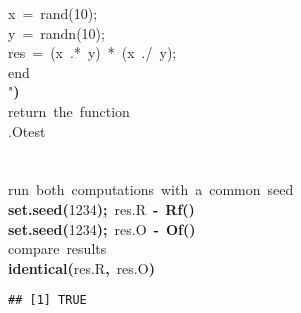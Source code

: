 \documentclass[english,10pt,a4paper]{article}\usepackage{graphicx, color}
\makeatletter
\newcommand{\hlnumber}[1]{\textcolor[rgb]{0,0,0}{#1}}%
\newcommand{\hlfunctioncall}[1]{\textcolor[rgb]{0.501960784313725,0,0.329411764705882}{\textbf{#1}}}%
\newcommand{\hlkeyword}[1]{\textcolor[rgb]{0,0,0}{\textbf{#1}}}%
\newcommand{\hlcomment}[1]{\textcolor[rgb]{0.180392156862745,0.6,0.341176470588235}{#1}}%
\newcommand{\hlassignement}[1]{\textcolor[rgb]{0,0,0}{\textbf{#1}}}%
\newcommand{\hlsymbol}[1]{\textcolor[rgb]{0,0,0}{#1}}%
\newcommand{\hlstd}[1]{\textcolor[rgb]{0,0,0}{#1}}%
\newenvironment{kframe}{%
 \def\FrameCommand##1{\hskip\@totalleftmargin \hskip-\fboxsep
 \colorbox{shadecolor}{##1}\hskip-\fboxsep
     \hskip-\linewidth \hskip-\@totalleftmargin \hskip\columnwidth}%
 \MakeFramed {\advance\hsize-\width
   \@totalleftmargin\z@ \linewidth\hsize
   \@setminipage}}%
 {\par\unskip\endMakeFramed}
\newenvironment{knitrout}{}{} %
\makeatother
\begin{document}
\begin{knitrout}
\begin{kframe}
\begin{flushleft}
{\hlstd{}x{\ }={\ }rand(10);\hspace*{\fill}\\
\hlstd{}y{\ }={\ }randn(10);\hspace*{\fill}\\
\hlstd{}res{\ }={\ }(x{\ }.*{\ }y){\ }*{\ }(x{\ }./{\ }y);\hspace*{\fill}\\
\hlstd{}end\hspace*{\fill}\\
\hlstd{}"{}}\hlkeyword{)}\hspace*{\fill}\\
\hlstd{}\hlcomment{\usebox{\hlnormalsizeboxhash}{\ }return{\ }the{\ }function}\hspace*{\fill}\\
\hlstd{}\hlsymbol{.O}\hlkeyword{\usebox{\hlnormalsizeboxdollar}}\hlsymbol{test}\hspace*{\fill}\\
\hlstd{}\hlkeyword{\usebox{\hlnormalsizeboxclosebrace}}\hspace*{\fill}\\
\hlstd{}\hspace*{\fill}\\
\hlstd{}\hlcomment{\usebox{\hlnormalsizeboxhash}{\ }run{\ }both{\ }computations{\ }with{\ }a{\ }common{\ }seed{\ }{\ }}\hspace*{\fill}\\
\hlstd{}\hlfunctioncall{set.seed}\hlkeyword{(}\hlnumber{1234}\hlkeyword{)}\hlkeyword{;}{\ }\hlsymbol{res.R}{\ }\hlassignement{\usebox{\hlnormalsizeboxlessthan}-}{\ }\hlfunctioncall{Rf}\hlkeyword{(}\hlkeyword{)}\hspace*{\fill}\\
\hlstd{}\hlfunctioncall{set.seed}\hlkeyword{(}\hlnumber{1234}\hlkeyword{)}\hlkeyword{;}{\ }\hlsymbol{res.O}{\ }\hlassignement{\usebox{\hlnormalsizeboxlessthan}-}{\ }\hlfunctioncall{Of}\hlkeyword{(}\hlkeyword{)}\hspace*{\fill}\\
\hlstd{}\hlcomment{\usebox{\hlnormalsizeboxhash}{\ }compare{\ }results}\hspace*{\fill}\\
\hlstd{}\hlfunctioncall{identical}\hlkeyword{(}\hlsymbol{res.R}\hlkeyword{,}{\ }\hlsymbol{res.O}\hlkeyword{)}\mbox{}
\normalfont
\end{flushleft}
\begin{verbatim}
## [1] TRUE
\end{verbatim}
\begin{flushleft}

\end{flushleft}
\end{kframe}
\end{knitrout}
\end{document}
